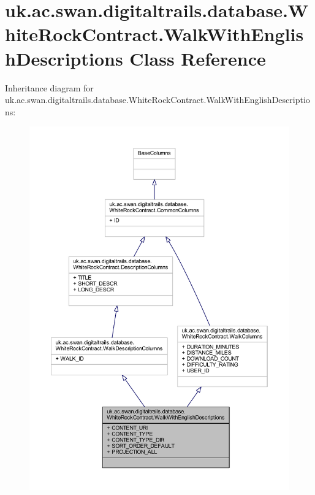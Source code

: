 \hypertarget{classuk_1_1ac_1_1swan_1_1digitaltrails_1_1database_1_1_white_rock_contract_1_1_walk_with_english_descriptions}{\section{uk.\+ac.\+swan.\+digitaltrails.\+database.\+White\+Rock\+Contract.\+Walk\+With\+English\+Descriptions Class Reference}
\label{classuk_1_1ac_1_1swan_1_1digitaltrails_1_1database_1_1_white_rock_contract_1_1_walk_with_english_descriptions}
}


Inheritance diagram for uk.\+ac.\+swan.\+digitaltrails.\+database.\+White\+Rock\+Contract.\+Walk\+With\+English\+Descriptions\+:
\nopagebreak
\begin{figure}[H]
\begin{center}
\leavevmode
\includegraphics[width=350pt]{classuk_1_1ac_1_1swan_1_1digitaltrails_1_1database_1_1_white_rock_contract_1_1_walk_with_english_descriptions__inherit__graph}
\end{center}
\end{figure}


